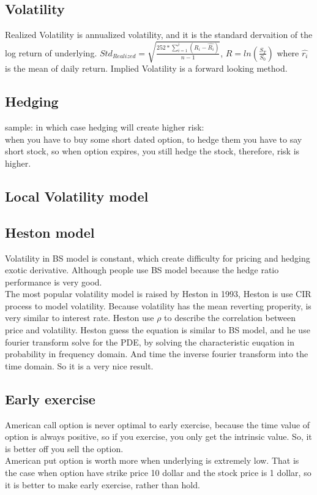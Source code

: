 \documentclass[a4paper,11pt]{article}
\begin{document}
\subsection{Volatility}
Realized Volatility is annualized volatility, and it is the standard dervaition of the log return of underlying. $Std_{Realized}=\sqrt{\frac{252*\sum_{i=1}^{i} (R_i-\hat{R_i})}{n-1}}$, $R=ln(\frac{S_T}{S_0})$ where $\hat{r_i}$ is the mean of daily return.
Implied Volatility is a forward looking method.
\subsection{Hedging}
sample: in which case hedging will create higher risk:\\
when you have to buy some short dated option, to hedge them you have to say short stock, so when option expires, you still hedge the stock, therefore, risk is higher. \\
\subsection{Local Volatility model}
\subsection{Heston model}
Volatility in BS model is constant, which create difficulty for pricing and hedging exotic derivative. Although people use BS model because the hedge ratio performance is very good.\\
The most popular volatility model is raised by Heston in 1993,  Heston is use CIR process to model volatility. Because volatility has the mean reverting properity, is very similar to interest rate. Heston use $\rho$ to describe the correlation between price and volatility. Heston guess the equation is similar to BS model, and he use fourier transform solve for the PDE, by solving the characteristic euqation in probability in frequency domain. And time the inverse fourier transform into the time domain. So it is a very nice result.\\
\subsection{Early exercise}
American call option is never optimal to early exercise, because the time value of option is always positive, so if you exercise, you only get the intrinsic value. So, it is better off you sell the option.\\
American put option is worth more when underlying is extremely low. That is the case when option have strike price 10 dollar and the stock price is 1 dollar, so it is better to make early exercise, rather than hold.
\end{document}
